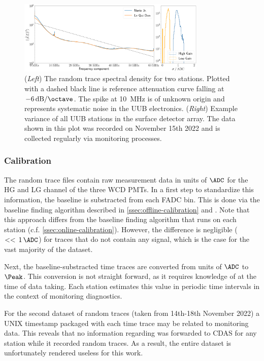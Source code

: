 \begin{figure}
	\centering
	\includegraphics[width=0.8\textwidth]{./plots/fft_variance_plot_combined.png}
	\caption{(\textit{Left}) The random trace spectral density for two stations. Plotted with a dashed black line is reference attenuation curve falling at 
	$\SI[per-mode=symbol]{-6}{\deci\bel\per\octave}$. The spike at \SI{10}{\mega\hertz} is of unknown origin and represents systematic noise in the UUB 
	electronics. (\textit{Right}) Example variance of all UUB stations in the surface detector array. The data shown in this plot was recorded on November 15th 
    2022 and is collected regularly via monitoring processes.}
	\label{fig:random-traces}
\end{figure}

\subsubsection{Calibration}
\label{ssec:random-trace-calibration}

The random trace files contain raw measurement data in units of $\SI{}{\ADC}$ for the HG and LG channel of the three WCD PMTs. In a first step to standardize this
information, the baseline is substracted from each FADC bin. This is done via the baseline finding algorithm described in \autoref{ssec:offline-calibration} and 
\cite{tobiasBaseline, tobiasBaselineUUB}. Note that this approach differs from the baseline finding algorithm that runs on each station (c.f. 
\autoref{ssec:online-calibration}). However, the difference is negligible ($<<\,\SI{1}{\ADC}$) for traces that do not contain any signal, which is the case for the 
vast majority of the dataset.

Next, the baseline-substracted time traces are converted from units of $\SI{}{\ADC}$ to $\SI{}{\Peak}$. This conversion is not straight forward, as it requires 
knowledge of \Ipeak at the time of data taking. Each station estimates this value in periodic time intervals in the context of monitoring diagnostics.

For the second dataset of random traces (taken from 14th-18th November 2022) a UNIX timestamp packaged with each time trace may be related to monitoring data. This 
reveals that no information regarding \Ipeak was forwarded to CDAS for any station while it recorded random traces. As a result, the entire dataset is unfortunately 
rendered useless for this work.

